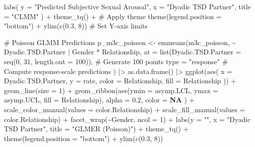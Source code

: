 \documentclass[
  bookmarksnumbered]{article}
\newenvironment{Shaded}{\begin{snugshade}}{\end{snugshade}}
\newcommand{\AttributeTok}[1]{\textcolor[rgb]{0.80,0.80,0.80}{#1}}
\newcommand{\CommentTok}[1]{\textcolor[rgb]{0.50,0.62,0.50}{#1}}
\newcommand{\ConstantTok}[1]{\textcolor[rgb]{0.86,0.64,0.64}{\textbf{#1}}}
\newcommand{\DecValTok}[1]{\textcolor[rgb]{0.86,0.86,0.80}{#1}}
\newcommand{\FloatTok}[1]{\textcolor[rgb]{0.75,0.75,0.82}{#1}}
\newcommand{\FunctionTok}[1]{\textcolor[rgb]{0.94,0.94,0.56}{#1}}
\newcommand{\NormalTok}[1]{\textcolor[rgb]{0.80,0.80,0.80}{#1}}
\newcommand{\OtherTok}[1]{\textcolor[rgb]{0.94,0.94,0.56}{#1}}
\newcommand{\SpecialCharTok}[1]{\textcolor[rgb]{0.86,0.64,0.64}{#1}}
\newcommand{\StringTok}[1]{\textcolor[rgb]{0.80,0.58,0.58}{#1}}
\begin{document}
\begin{Shaded}
\begin{Highlighting}[]
  \FunctionTok{labs}\NormalTok{(}
    \AttributeTok{y =} \StringTok{"Predicted Subjective Sexual Arousal"}\NormalTok{, }\AttributeTok{x =} \StringTok{"Dyadic TSD Partner"}\NormalTok{,}
    \AttributeTok{title =} \StringTok{"CLMM"}
\NormalTok{  ) }\SpecialCharTok{+}
  \FunctionTok{theme\_tq}\NormalTok{() }\SpecialCharTok{+} \CommentTok{\# Apply theme}
  \FunctionTok{theme}\NormalTok{(}\AttributeTok{legend.position =} \StringTok{"bottom"}\NormalTok{) }\SpecialCharTok{+}
  \FunctionTok{ylim}\NormalTok{(}\FunctionTok{c}\NormalTok{(}\FloatTok{0.3}\NormalTok{, }\DecValTok{8}\NormalTok{)) }\CommentTok{\# Set Y{-}axis limits}

\CommentTok{\# Poisson GLMM Predictions}
\NormalTok{p\_m3c\_poisson }\OtherTok{\textless{}{-}} \FunctionTok{emmeans}\NormalTok{(m3c\_poisson, }\SpecialCharTok{\textasciitilde{}}\NormalTok{ Dyadic.TSD.Partner }\SpecialCharTok{|}\NormalTok{ Gender }\SpecialCharTok{*}\NormalTok{ Relationship,}
  \AttributeTok{at =} \FunctionTok{list}\NormalTok{(}\AttributeTok{Dyadic.TSD.Partner =} \FunctionTok{seq}\NormalTok{(}\DecValTok{0}\NormalTok{, }\DecValTok{31}\NormalTok{, }\AttributeTok{length.out =} \DecValTok{100}\NormalTok{)), }\CommentTok{\# Generate 100 points}
  \AttributeTok{type =} \StringTok{"response"} \CommentTok{\# Compute response{-}scale predictions}
\NormalTok{) }\SpecialCharTok{|\textgreater{}}
  \FunctionTok{as.data.frame}\NormalTok{() }\SpecialCharTok{|\textgreater{}}
  \FunctionTok{ggplot}\NormalTok{(}\FunctionTok{aes}\NormalTok{(}
    \AttributeTok{x =}\NormalTok{ Dyadic.TSD.Partner, }\AttributeTok{y =}\NormalTok{ rate,}
    \AttributeTok{color =}\NormalTok{ Relationship, }\AttributeTok{fill =}\NormalTok{ Relationship}
\NormalTok{  )) }\SpecialCharTok{+}
  \FunctionTok{geom\_line}\NormalTok{(}\AttributeTok{size =} \DecValTok{1}\NormalTok{) }\SpecialCharTok{+}
  \FunctionTok{geom\_ribbon}\NormalTok{(}\FunctionTok{aes}\NormalTok{(}\AttributeTok{ymin =}\NormalTok{ asymp.LCL, }\AttributeTok{ymax =}\NormalTok{ asymp.UCL, }\AttributeTok{fill =}\NormalTok{ Relationship),}
    \AttributeTok{alpha =} \FloatTok{0.2}\NormalTok{, }\AttributeTok{color =} \ConstantTok{NA}
\NormalTok{  ) }\SpecialCharTok{+}
  \FunctionTok{scale\_color\_manual}\NormalTok{(}\AttributeTok{values =}\NormalTok{ color.Relationship) }\SpecialCharTok{+}
  \FunctionTok{scale\_fill\_manual}\NormalTok{(}\AttributeTok{values =}\NormalTok{ color.Relationship) }\SpecialCharTok{+}
  \FunctionTok{facet\_wrap}\NormalTok{(}\SpecialCharTok{\textasciitilde{}}\NormalTok{Gender, }\AttributeTok{ncol =} \DecValTok{1}\NormalTok{) }\SpecialCharTok{+}
  \FunctionTok{labs}\NormalTok{(}\AttributeTok{y =} \StringTok{""}\NormalTok{, }\AttributeTok{x =} \StringTok{"Dyadic TSD Partner"}\NormalTok{, }\AttributeTok{title =} \StringTok{"GLMER (Poisson)"}\NormalTok{) }\SpecialCharTok{+}
  \FunctionTok{theme\_tq}\NormalTok{() }\SpecialCharTok{+}
  \FunctionTok{theme}\NormalTok{(}\AttributeTok{legend.position =} \StringTok{"bottom"}\NormalTok{) }\SpecialCharTok{+}
  \FunctionTok{ylim}\NormalTok{(}\FunctionTok{c}\NormalTok{(}\FloatTok{0.3}\NormalTok{, }\DecValTok{8}\NormalTok{))}


\end{Highlighting}
\end{Shaded}
\end{document}
